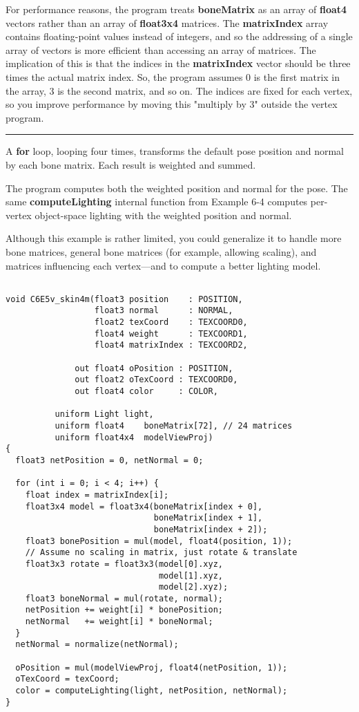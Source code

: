 \documentclass[../main.tex]{subfiles}
\begin{document}
For performance reasons, the program treats \textbf{boneMatrix} as an array of \textbf{float4} vectors rather than an array of \textbf{float3x4} matrices. The \textbf{matrixIndex} array contains floating-point values instead of integers, and so the addressing of a single array of vectors is more efficient than accessing an array of matrices. The implication of this is that the indices in the \textbf{matrixIndex} vector should be three times the actual matrix index. So, the program assumes 0 is the first matrix in the array, 3 is the second matrix, and so on. The indices are fixed for each vertex, so you improve performance by moving this "multiply by 3" outside the vertex program.
\hrule

A \textbf{for} loop, looping four times, transforms the default pose position and normal by each bone matrix. Each result is weighted and summed.

The program computes both the weighted position and normal for the pose. The same \textbf{computeLighting} internal function from Example 6-4 computes per-vertex object-space lighting with the weighted position and normal.

Although this example is rather limited, you could generalize it to handle more bone matrices, general bone matrices (for example, allowing scaling), and matrices influencing each vertex—and to compute a better lighting model.

\FloatBarrier
\begin{lstlisting}[caption=Example 6-5. The C6E5v_skin4m Vertex Program]

void C6E5v_skin4m(float3 position    : POSITION,
                  float3 normal      : NORMAL,
                  float2 texCoord    : TEXCOORD0,
                  float4 weight      : TEXCOORD1,
                  float4 matrixIndex : TEXCOORD2,

              out float4 oPosition : POSITION,
              out float2 oTexCoord : TEXCOORD0,
              out float4 color     : COLOR,

          uniform Light light,
          uniform float4    boneMatrix[72], // 24 matrices
          uniform float4x4  modelViewProj)
{
  float3 netPosition = 0, netNormal = 0;

  for (int i = 0; i < 4; i++) {
    float index = matrixIndex[i];
    float3x4 model = float3x4(boneMatrix[index + 0],
                              boneMatrix[index + 1],
                              boneMatrix[index + 2]);
    float3 bonePosition = mul(model, float4(position, 1));
    // Assume no scaling in matrix, just rotate & translate
    float3x3 rotate = float3x3(model[0].xyz,
                               model[1].xyz,
                               model[2].xyz);
    float3 boneNormal = mul(rotate, normal);
    netPosition += weight[i] * bonePosition;
    netNormal   += weight[i] * boneNormal;
  }
  netNormal = normalize(netNormal);

  oPosition = mul(modelViewProj, float4(netPosition, 1));
  oTexCoord = texCoord;
  color = computeLighting(light, netPosition, netNormal);
}
\end{lstlisting}
\FloatBarrier
\end{document}
